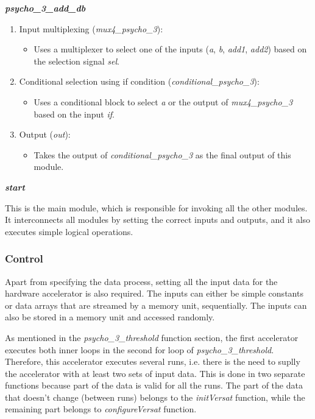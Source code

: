 \vspace{0.5cm}

\textbf{\textit{psycho\_3\_add\_db}}

\begin{enumerate}

\item Input multiplexing (\textit{mux4\_psycho\_3}):
\begin{itemize}
\item Uses a multiplexer to select one of the inputs (\textit{a}, \textit{b}, \textit{add1}, \textit{add2}) based on the selection signal \textit{sel}.
\end{itemize}

\item Conditional selection using if condition (\textit{conditional\_psycho\_3}):
\begin{itemize}
\item Uses a conditional block to select \textit{a} or the output of \textit{mux4\_psycho\_3} based on the input \textit{if}.
\end{itemize}

\item Output (\textit{out}):
\begin{itemize}
\item Takes the output of \textit{conditional\_psycho\_3} as the final output of this module.
\end{itemize}

\end{enumerate}

\vspace{0.5cm}

\textbf{\textit{start}}

This is the main module, which is responsible for invoking all the other modules. It interconnects all modules by setting the correct inputs and outputs, and it also executes simple logical operations.


\subsubsection{Control}
Apart from specifying the data process, setting all the input data for the hardware accelerator is also required. The inputs can either be simple constants or data arrays that are streamed by a memory unit, sequentially. The inputs can also be stored in a memory unit and accessed randomly.

As mentioned in the \textit{psycho\_3\_threshold} function section, the first accelerator executes both inner loops in the second for loop of \textit{psycho\_3\_threshold}.
Therefore, this accelerator executes several runs, i.e. there is the need to suplly the accelerator with at least two sets of input data.
This is done in two separate functions because part of the data is valid for all the runs. The part of the data that doesn't change (between runs) belongs to the \textit{initVersat} function, while the remaining part belongs to \textit{configureVersat} function.

